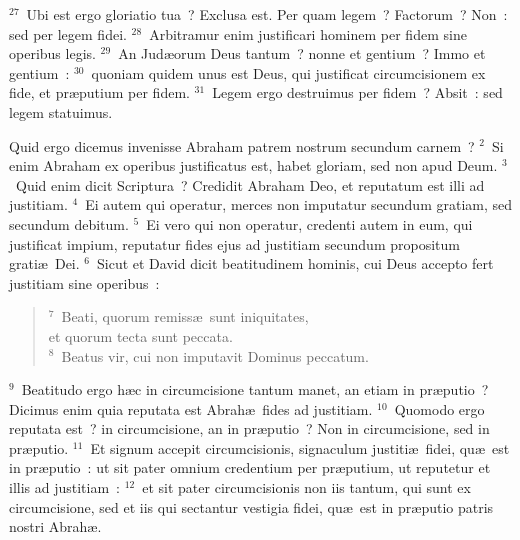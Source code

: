 ${}^{27}$~Ubi est ergo gloriatio tua~? Exclusa est. Per quam legem~? Factorum~? Non~: sed per legem fidei.
${}^{28}$~Arbitramur enim justificari hominem per fidem sine operibus legis.
${}^{29}$~An Jud\ae orum Deus tantum~? nonne et gentium~? Immo et gentium~:
${}^{30}$~quoniam quidem unus est Deus, qui justificat circumcisionem ex fide, et pr\ae putium per fidem.
${}^{31}$~Legem ergo destruimus per fidem~? Absit~: sed legem statuimus.

\lettrine[lines=10,image=true,loversize=0.05,lraise=-0.03]{Q}{}uid ergo dicemus invenisse Abraham patrem nostrum secundum carnem~?
${}^{2}$~Si enim Abraham ex operibus justificatus est, habet gloriam, sed non apud Deum.
${}^{3}$~Quid enim dicit Scriptura~? Credidit Abraham Deo, et reputatum est illi ad justitiam.
${}^{4}$~Ei autem qui operatur, merces non imputatur secundum gratiam, sed secundum debitum.
${}^{5}$~Ei vero qui non operatur, credenti autem in eum, qui justificat impium, reputatur fides ejus ad justitiam secundum propositum grati\ae\ Dei.
${}^{6}$~Sicut et David dicit beatitudinem hominis, cui Deus accepto fert justitiam sine operibus~:
\begin{flushleft}\begin{verse}${}^{7}$~Beati, quorum remiss\ae\ sunt iniquitates,\\ et quorum tecta sunt peccata.\\
${}^{8}$~Beatus vir, cui non imputavit Dominus peccatum.\end{verse}\end{flushleft}


${}^{9}$~Beatitudo ergo h\ae c in circumcisione tantum manet, an etiam in pr\ae putio~? Dicimus enim quia reputata est Abrah\ae\ fides ad justitiam.
${}^{10}$~Quomodo ergo reputata est~? in circumcisione, an in pr\ae putio~? Non in circumcisione, sed in pr\ae putio.
${}^{11}$~Et signum accepit circumcisionis, signaculum justiti\ae\ fidei, qu\ae\ est in pr\ae putio~: ut sit pater omnium credentium per pr\ae putium, ut reputetur et illis ad justitiam~:
${}^{12}$~et sit pater circumcisionis non iis tantum, qui sunt ex circumcisione, sed et iis qui sectantur vestigia fidei, qu\ae\ est in pr\ae putio patris nostri Abrah\ae .


